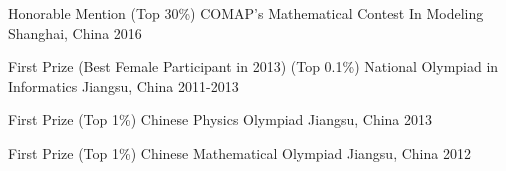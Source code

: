 
\begin{cvhonors}

  \cvhonor
    {Honorable Mention (Top 30\%)} %
    {COMAP's Mathematical Contest In Modeling} %
    {Shanghai, China} %
    {2016} %

  \cvhonor
    {First Prize (Best Female Participant in 2013) (Top 0.1\%)} %
    {National Olympiad in Informatics} %
    {Jiangsu, China} %
    {2011-2013} %

  \cvhonor
    {First Prize (Top 1\%)} %
    {Chinese Physics Olympiad} %
    {Jiangsu, China} %
    {2013} %

  \cvhonor
    {First Prize (Top 1\%)} %
    {Chinese Mathematical Olympiad} %
    {Jiangsu, China} %
    {2012} %

\end{cvhonors}


